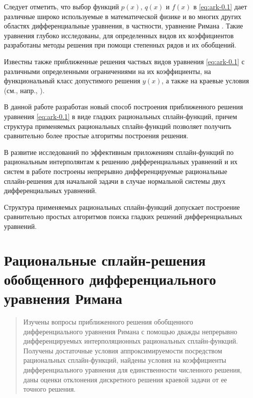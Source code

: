 Следует отметить, что выбор функций $p(x)$, $q(x)$ и $f(x)$ в \eqref{eq:ark-0.1} дает различные 
широко используемые в математической физике и во многих других областях дифференциальные 
уравнения, в частности, уравнение Римана \cite{bib:ark-1,bib:ark-2,bib:ark-3}. Такие уравнения глубоко
исследованы, для определенных видов их коэффициентов разработаны методы
решения при помощи степенных рядов и их обобщений.

Известны также приближенные решения частных видов уравнения \eqref{eq:ark-0.1} с различными 
определенными ограничениями на их коэффициенты, на функциональный класс допустимого 
решения $y(x)$, а также на краевые условия (см., напр., \cite{bib:ark-4,bib:ark-5,bib:ark-6,bib:ark-7,bib:ark-8,bib:ark-9,bib:ark-10}).

В данной работе разработан новый способ построения приближенного решения уравнения 
\eqref{eq:ark-0.1} в виде гладких рациональных сплайн-функций, причем структура применяемых 
рациональных сплайн-функций позволяет получить сравнительно более простые алгоритмы 
построения решения.

В развитие исследований по эффективным приложениям сплайн-функций по рациональным
 интерполянтам к решению дифференциальных уравнений и их систем в работе \cite{bib:ark-19}
 построены непрерывно дифференцируемые рациональные сплайн-решения
 для начальной задачи в случае нормальной системы двух дифференциальных уравнений.

Структура применяемых рациональных сплайн-функций допускает построение сравнительно 
простых алгоритмов поиска гладких решений дифференциальных уравнений.   



\section{Рациональные сплайн-решения обобщенного дифференциального уравнения Римана}

\begin{abstract}
Изучены вопросы приближенного решения обобщенного дифференциального уравнения Римана 
с помощью дважды непрерывно дифференцируемых интерполяционных рациональных 
сплайн-функций. Получены достаточные условия аппроксимируемости посредством
рациональных сплайн-функций, найдены условия на коэффициенты дифференциального уравнения
 для единственности численного решения, даны оценки отклонения дискретного решения 
краевой задачи от ее точного решения. 
\end{abstract}


